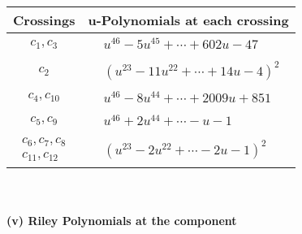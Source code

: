 \documentclass[1p]{elsarticle_modified}
\theoremstyle{definition}
\begin{document}
\begin{tabular}{m{50pt}|m{274pt}}
Crossings & \hspace{64pt}u-Polynomials at each crossing \\
\hline $$\begin{aligned}c_{1},c_{3}\end{aligned}$$&$\begin{aligned}
&u^{46}-5 u^{45}+\cdots+602 u-47
\end{aligned}$\\
\hline $$\begin{aligned}c_{2}\end{aligned}$$&$\begin{aligned}
&(u^{23}-11 u^{22}+\cdots+14 u-4)^{2}
\end{aligned}$\\
\hline $$\begin{aligned}c_{4},c_{10}\end{aligned}$$&$\begin{aligned}
&u^{46}-8 u^{44}+\cdots+2009 u+851
\end{aligned}$\\
\hline $$\begin{aligned}c_{5},c_{9}\end{aligned}$$&$\begin{aligned}
&u^{46}+2 u^{44}+\cdots- u-1
\end{aligned}$\\
\hline $$\begin{aligned}c_{6},c_{7},c_{8}\\c_{11},c_{12}\end{aligned}$$&$\begin{aligned}
&(u^{23}-2 u^{22}+\cdots-2 u-1)^{2}
\end{aligned}$\\
\hline
\end{tabular}\\~\\
\newpage\renewcommand{\arraystretch}{1}
\flushleft \textbf{(v) Riley Polynomials at the component}\newline \\
\end{document}
